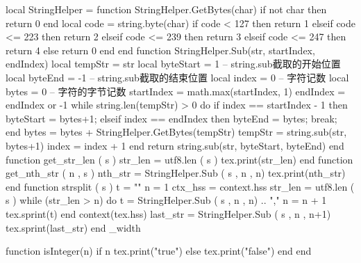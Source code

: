 \startluacode
local  StringHelper = {}
function StringHelper.GetBytes(char)
   if not char then
      return 0
   end
   local code = string.byte(char)
   if code < 127 then
      return 1
   elseif code <= 223 then
      return 2
   elseif code <= 239 then
      return 3
   elseif code <= 247 then
      return 4
   else
      return 0
   end
end
function StringHelper.Sub(str, startIndex, endIndex)
   local tempStr = str
   local byteStart = 1 -- string.sub截取的开始位置
   local byteEnd = -1 -- string.sub截取的结束位置
   local index = 0  -- 字符记数
   local bytes = 0  -- 字符的字节记数
   startIndex = math.max(startIndex, 1)
   endIndex = endIndex or -1
   while string.len(tempStr) > 0 do
      if index == startIndex - 1 then
         byteStart = bytes+1;
      elseif index == endIndex then
         byteEnd = bytes;
         break;
      end
      bytes = bytes + StringHelper.GetBytes(tempStr)
      tempStr = string.sub(str, bytes+1)
      index = index + 1
   end
   return string.sub(str, byteStart, byteEnd)
end
function get_str_len ( s )
  str_len = utf8.len ( s )
  tex.print(str_len)
end
function get_nth_str ( n , s )
  nth_str = StringHelper.Sub ( s , n , n)
  tex.print(nth_str)
end
function strsplit ( s )
  t = ""
  n = 1
  ctx_hss = context.hss
  str_len = utf8.len ( s )
  while (str_len > n) do
    t = StringHelper.Sub ( s , n , n) .. "{,}"
    n = n + 1
    tex.sprint(t)
  end
  context(tex.hss)
  last_str = StringHelper.Sub ( s , n , n+1)
  tex.sprint(last_str)
end
\stopluacode
\newdimen\autojustify_width
\def\autojustify{\dosingleempty\doautojustify}
\def\doautojustify[#1]#2{%
 \doifsomethingelse{#1}{\autojustify_width = #1}{\autojustify_width = 3em}%
 \newcount\cnt_str_len \cnt_str_len = \directlua{get_str_len ("#2")}%
 \hbox to \autojustify_width {%
 \dorecurse{\numexpr\cnt_str_len - 1}%
           {\directlua{get_nth_str(\recurselevel,"#2")}\hfil}%
            \directlua{get_nth_str(\number\cnt_str_len,"#2")}%
}}


\def\@gobbletwo#1#2{}
\def\xColorNthChar#1#2{%
\ifnum\ifx\empty#21\else#1\fi=1%
\color[red]{#2}\expandafter\@gobbletwo%
\else#2\fi\xColorNthChar{\numexpr#1-1\relax}}
\def\ColorNthChar#1#2{\xColorNthChar{#1}#2\empty}
\startluacode
  function isInteger(n)
        if n %
          tex.print("true")
        else
          tex.print("false")
        end
  end
\stopluacode
\def\float_calc#1{\directlua{tex.sprint(#1)}}
\def\ifInteger#1{\directluacode{isInteger(#1)}}
\def\autoright#1{%
  {\unskip\nobreak\hfil\penalty50
   \hskip2em\hbox{}\nobreak\hfil#1
      \parfillskip=0pt \finalhyphendemerits=0 \par}}
\def\vapour#1{\vrule width 0pt \nobreak%
    \newdimen\tempwidth%
    \setbox0=\hbox{#1}%
    \tempwidth=\wd0%
    \hbox to \tempwidth{}%
    \hskip 0pt plus 0pt minus 0pt}


